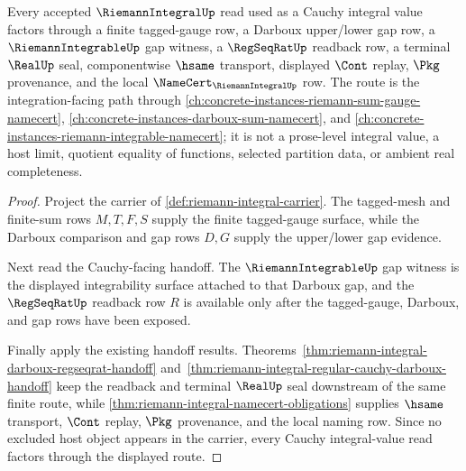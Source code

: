 \begin{theorem}
\label{thm:riemannintegral-cauchy-route}
Every accepted $\RiemannIntegralUp$ read used as a Cauchy integral value factors through a finite tagged-gauge row, a Darboux upper/lower gap row, a $\RiemannIntegrableUp$ gap witness, a $\RegSeqRatUp$ readback row, a terminal $\RealUp$ seal, componentwise $\hsame$ transport, displayed $\Cont$ replay, $\Pkg$ provenance, and the local $\NameCert_{\RiemannIntegralUp}$ row. The route is the integration-facing path through \autoref{ch:concrete-instances-riemann-sum-gauge-namecert}, \autoref{ch:concrete-instances-darboux-sum-namecert}, and \autoref{ch:concrete-instances-riemann-integrable-namecert}; it is not a prose-level integral value, a host limit, quotient equality of functions, selected partition data, or ambient real completeness.
\end{theorem}
\begin{proof}
Project the carrier of \autoref{def:riemann-integral-carrier}. The tagged-mesh and finite-sum rows $M,T,F,S$ supply the finite tagged-gauge surface, while the Darboux comparison and gap rows $D,G$ supply the upper/lower gap evidence.

Next read the Cauchy-facing handoff. The $\RiemannIntegrableUp$ gap witness is the displayed integrability surface attached to that Darboux gap, and the $\RegSeqRatUp$ readback row $R$ is available only after the tagged-gauge, Darboux, and gap rows have been exposed.

Finally apply the existing handoff results. Theorems~\ref{thm:riemann-integral-darboux-regseqrat-handoff} and~\ref{thm:riemann-integral-regular-cauchy-darboux-handoff} keep the readback and terminal $\RealUp$ seal downstream of the same finite route, while \autoref{thm:riemann-integral-namecert-obligations} supplies $\hsame$ transport, $\Cont$ replay, $\Pkg$ provenance, and the local naming row. Since no excluded host object appears in the carrier, every Cauchy integral-value read factors through the displayed route.
\end{proof}

